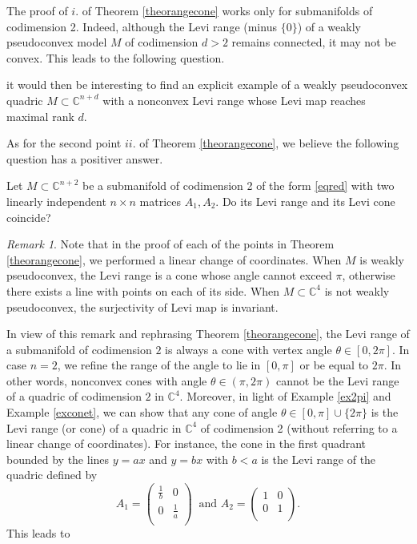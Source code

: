 \documentclass[12pt]{amsart}
\newcommand{\C}{\mathbb C}
\theoremstyle{remark}
\newtheorem{remark}[theo]{Remark}
\theoremstyle{example}
\theoremstyle{definition}
\numberwithin{equation}{section}
\begin{document}
The proof of $i.$ of Theorem \ref{theorangecone} works only for submanifolds of codimension 2. Indeed, although the Levi range (minus $\{0\}$) of a weakly pseudoconvex model $M$ of codimension $d>2$ remains connected, it may not be convex. This leads to the following question. 

\vspace{0.1cm}
 it would then be interesting to find an explicit example of a weakly pseudoconvex quadric $M \subset \C^{n+d}$ with a nonconvex Levi range whose Levi map reaches maximal rank $d$. 
 \vspace{0.5cm}
 
 
As for the second point $ii.$ of Theorem \ref{theorangecone}, we believe the following question has a positiver answer. 

\vspace{0.1cm}
 Let $M \subset \C^{n+2}$ be a submanifold of codimension 2 of the form \eqref{eqred} with  two linearly independent $n\times n$ matrices $A_1,A_2$. Do its Levi range and its Levi cone coincide? 


 
 

 \vspace{0.5cm}

\begin{remark}
Note that in the proof of  each of the points in Theorem \ref{theorangecone}, we performed a linear change of coordinates. 
When $M$ is weakly pseudoconvex, the Levi range is a cone whose angle cannot exceed $\pi$, otherwise there exists a line with points on each of its side. When $M\subset \C^4$ is not  weakly pseudoconvex, the surjectivity of Levi map is invariant.  
 \end{remark}


In view of this remark and rephrasing Theorem \ref{theorangecone}, the Levi range of a submanifold of codimension $2$ is always a cone with vertex angle $\theta \in [0,2\pi].$ In case $n=2$, we refine the range of the angle to lie in $[0,\pi]$ or be equal to $2\pi$. In other words, nonconvex cones with angle $\theta \in (\pi,2\pi)$ cannot be the Levi range of a  quadric of codimension $2$ in $\C^4$. Moreover, in light of Example \ref{ex2pi} and Example \ref{exconet}, we can show that any cone of angle 
$\theta \in [0,\pi] \cup \{2\pi\}$ is the Levi range (or cone) of a quadric in $\C^4$ of codimension 2 (without referring to a linear change of coordinates).  For instance, the cone in the first quadrant bounded by the lines $y=ax$ and $y=bx$ with $b<a$ is the Levi range of the quadric  defined by 
  $$A_1=\begin{pmatrix}
\frac{1}{b}& 0 \\
0 & \frac{1}{a}\\
\end{pmatrix} \ \mbox{ and } A_2=\begin{pmatrix}
1 & 0 \\
0 & 1\\
\end{pmatrix}.$$
This leads to 
\end{document}
